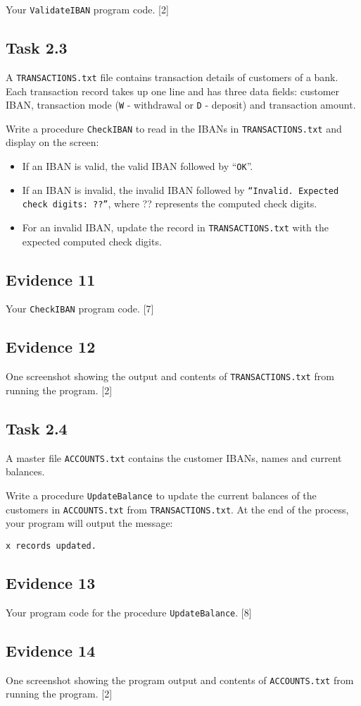 Your \texttt{ValidateIBAN} program code. \hfill{}{[}2{]}

\subsection*{Task 2.3 }

A \texttt{TRANSACTIONS.txt} file contains transaction details of customers
of a bank. Each transaction record takes up one line and has three
data fields: customer IBAN, transaction mode (\texttt{W} - withdrawal
or \texttt{D} - deposit) and transaction amount. 

Write a procedure \texttt{CheckIBAN} to read in the IBANs in \texttt{TRANSACTIONS.txt}
and display on the screen: 
\begin{itemize}
\item If an IBAN is valid, the valid IBAN followed by \textquotedblleft \texttt{OK}\textquotedblright . 
\item If an IBAN is invalid, the invalid IBAN followed by \texttt{\textquotedblleft Invalid. Expected
check digits: ??\textquotedblright }, where ?? represents the computed
check digits. 
\item For an invalid IBAN, update the record in \texttt{TRANSACTIONS.txt}
with the expected computed check digits.
\end{itemize}

\subsection*{Evidence 11 }

Your \texttt{CheckIBAN} program code.\hfill{} {[}7{]}

\subsection*{Evidence 12 }

One screenshot showing the output and contents of \texttt{TRANSACTIONS.txt}
from running the program. {[}2{]} 

\subsection*{Task 2.4 }

A master file \texttt{ACCOUNTS.txt} contains the customer IBANs, names
and current balances. 

Write a procedure \texttt{UpdateBalance} to update the current balances
of the customers in \texttt{ACCOUNTS.txt} from \texttt{TRANSACTIONS.txt}.
At the end of the process, your program will output the message: 

\texttt{x records updated. }

\subsection*{Evidence 13}

Your program code for the procedure \texttt{UpdateBalance}.\hfill{}
{[}8{]}

\subsection*{Evidence 14}

One screenshot showing the program output and contents of \texttt{ACCOUNTS.txt}
from running the program.\hfill{} {[}2{]}